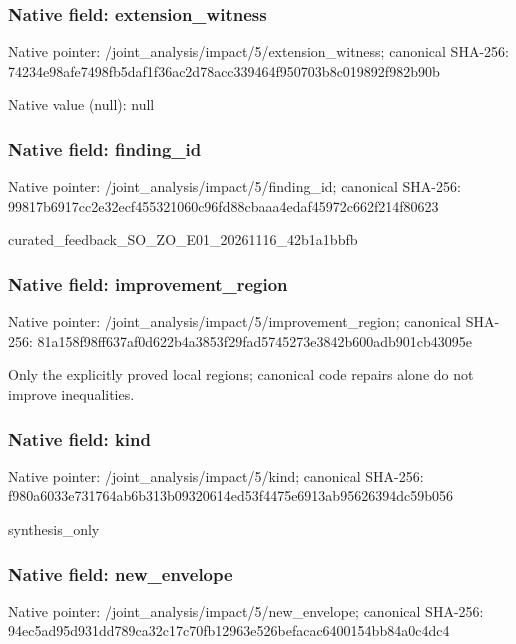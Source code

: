 \documentclass[10pt,a4paper]{article}
\begin{document}
\subsubsection{Native field: extension\_\allowbreak{}witness}
Native pointer: /joint\_\allowbreak{}analysis/impact/5/extension\_\allowbreak{}witness; canonical SHA-256: 74234e98afe7498fb5daf1f36ac2d78acc339464f950703b8c019892f982b90b

Native value (null): null

\subsubsection{Native field: finding\_\allowbreak{}id}
Native pointer: /joint\_\allowbreak{}analysis/impact/5/finding\_\allowbreak{}id; canonical SHA-256: 99817b6917cc2e32ecf455321060c96fd88cbaaa4edaf45972c662f214f80623

\begingroup\raggedright\sloppy curated\_\allowbreak{}feedback\_\allowbreak{}SO\_\allowbreak{}ZO\_\allowbreak{}E01\_\allowbreak{}20261116\_\allowbreak{}42b1a1bbfb\par\endgroup

\subsubsection{Native field: improvement\_\allowbreak{}region}
Native pointer: /joint\_\allowbreak{}analysis/impact/5/improvement\_\allowbreak{}region; canonical SHA-256: 81a158f98ff637af0d622b4a3853f29fad5745273e3842b600adb901cb43095e

\begingroup\raggedright\sloppy Only the explicitly proved local regions;\allowbreak{} canonical code repairs alone do not improve inequalities.\par\endgroup

\subsubsection{Native field: kind}
Native pointer: /joint\_\allowbreak{}analysis/impact/5/kind; canonical SHA-256: f980a6033e731764ab6b313b09320614ed53f4475e6913ab95626394dc59b056

\begingroup\raggedright\sloppy synthesis\_\allowbreak{}only\par\endgroup

\subsubsection{Native field: new\_\allowbreak{}envelope}
Native pointer: /joint\_\allowbreak{}analysis/impact/5/new\_\allowbreak{}envelope; canonical SHA-256: 94ec5ad95d931dd789ca32c17c70fb12963e526befacac6400154bb84a0c4dc4
\end{document}

